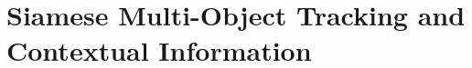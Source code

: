 \section{Siamese Multi-Object Tracking and Contextual Information}
\label{sec:SiamMOTandContextRCNN}
